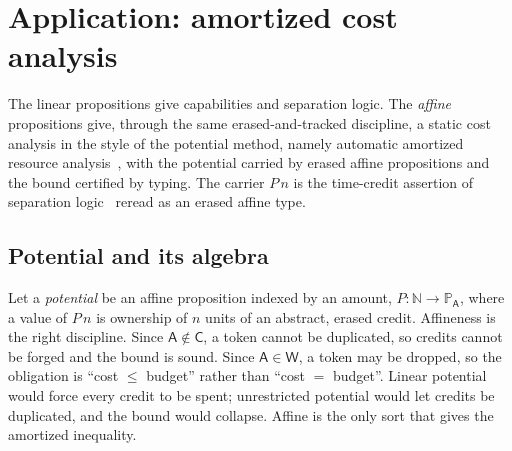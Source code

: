\documentclass[11pt]{article}
\newcommand{\Wk}{\mathsf{W}}
\newcommand{\Co}{\mathsf{C}}
\newcommand{\Prop}[1]{\mathbb{P}_{#1}}            %
\theoremstyle{definition}
\theoremstyle{plain}
\begin{document}
\section{Application: amortized cost analysis}\label{sec:cost}

The linear propositions give capabilities and separation logic. The \emph{affine}
propositions give, through the same erased-and-tracked discipline, a static cost
analysis in the style of the potential method, namely automatic amortized resource
analysis~\cite{hj,raml}, with the potential carried by erased affine propositions
and the bound certified by typing. The carrier $P\,n$ is the time-credit assertion
of separation logic~\cite{timecredits} reread as an erased affine type.

\subsection{Potential and its algebra}

Let a \emph{potential} be an affine proposition indexed by an amount,
$P : \mathbb{N}\to\Prop{\mathsf{A}}$, where a value of $P\,n$ is ownership of $n$
units of an abstract, erased credit. Affineness is the right discipline. Since
$\mathsf{A}\notin\Co$, a token cannot be duplicated, so credits cannot be forged
and the bound is sound. Since $\mathsf{A}\in\Wk$, a token may be dropped, so the
obligation is ``cost $\le$ budget'' rather than ``cost $=$ budget''. Linear
potential would force every credit to be spent; unrestricted potential would let
credits be duplicated, and the bound would collapse. Affine is the only sort that
gives the amortized inequality.
\end{document}
